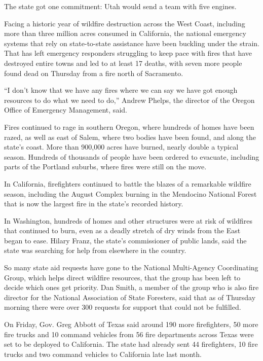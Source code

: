 The state got one commitment: Utah would send a team with five engines.

Facing a historic year of wildfire destruction across the West Coast,
including more than three million acres consumed in California, the
national emergency systems that rely on state-to-state assistance have
been buckling under the strain. That has left emergency responders
struggling to keep pace with fires that have destroyed entire towns and
led to at least 17 deaths, with seven more people found dead on Thursday
from a fire north of Sacramento.

``I don't know that we have any fires where we can say we have got
enough resources to do what we need to do,'' Andrew Phelps, the director
of the Oregon Office of Emergency Management, said.

Fires continued to rage in southern Oregon, where hundreds of homes have
been razed, as well as east of Salem, where two bodies have been found,
and along the state's coast. More than 900,000 acres have burned, nearly
double a typical season. Hundreds of thousands of people have been
ordered to evacuate, including parts of the Portland suburbs, where
fires were still on the move.

In California, firefighters continued to battle the blazes of a
remarkable wildfire season, including the August Complex burning in the
Mendocino National Forest that is now the largest fire in the state's
recorded history.

In Washington, hundreds of homes and other structures were at risk of
wildfires that continued to burn, even as a deadly stretch of dry winds
from the East began to ease. Hilary Franz, the state's commissioner of
public lands, said the state was searching for help from elsewhere in
the country.

So many state aid requests have gone to the National Multi-Agency
Coordinating Group, which helps direct wildfire resources, that the
group has been left to decide which ones get priority. Dan Smith, a
member of the group who is also fire director for the National
Association of State Foresters, said that as of Thursday morning there
were over 300 requests for support that could not be fulfilled.

On Friday, Gov. Greg Abbott of Texas said around 190 more firefighters,
50 more fire trucks and 10 command vehicles from 56 fire departments
across Texas were set to be deployed to California. The state had
already sent 44 firefighters, 10 fire trucks and two command vehicles to
California late last month.

